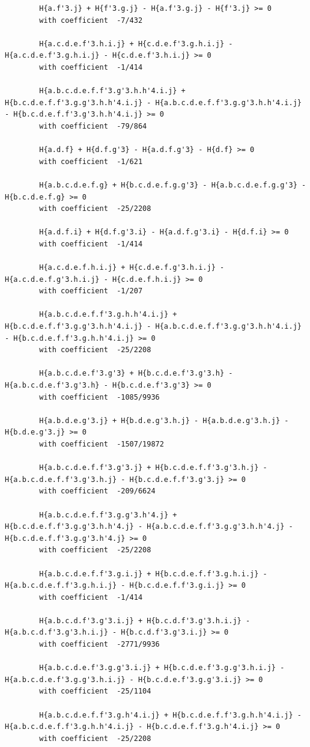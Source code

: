 \documentclass[11pt, a4paper]{kybernetika}
\begin{document}
\begin{verbatim}
		H{a.f'3.j} + H{f'3.g.j} - H{a.f'3.g.j} - H{f'3.j} >= 0
		with coefficient  -7/432
		
		H{a.c.d.e.f'3.h.i.j} + H{c.d.e.f'3.g.h.i.j} - H{a.c.d.e.f'3.g.h.i.j} - H{c.d.e.f'3.h.i.j} >= 0
		with coefficient  -1/414
		
		H{a.b.c.d.e.f.f'3.g'3.h.h'4.i.j} + H{b.c.d.e.f.f'3.g.g'3.h.h'4.i.j} - H{a.b.c.d.e.f.f'3.g.g'3.h.h'4.i.j} - H{b.c.d.e.f.f'3.g'3.h.h'4.i.j} >= 0
		with coefficient  -79/864
		
		H{a.d.f} + H{d.f.g'3} - H{a.d.f.g'3} - H{d.f} >= 0
		with coefficient  -1/621
		
		H{a.b.c.d.e.f.g} + H{b.c.d.e.f.g.g'3} - H{a.b.c.d.e.f.g.g'3} - H{b.c.d.e.f.g} >= 0
		with coefficient  -25/2208
		
		H{a.d.f.i} + H{d.f.g'3.i} - H{a.d.f.g'3.i} - H{d.f.i} >= 0
		with coefficient  -1/414
		
		H{a.c.d.e.f.h.i.j} + H{c.d.e.f.g'3.h.i.j} - H{a.c.d.e.f.g'3.h.i.j} - H{c.d.e.f.h.i.j} >= 0
		with coefficient  -1/207
		
		H{a.b.c.d.e.f.f'3.g.h.h'4.i.j} + H{b.c.d.e.f.f'3.g.g'3.h.h'4.i.j} - H{a.b.c.d.e.f.f'3.g.g'3.h.h'4.i.j} - H{b.c.d.e.f.f'3.g.h.h'4.i.j} >= 0
		with coefficient  -25/2208
		
		H{a.b.c.d.e.f'3.g'3} + H{b.c.d.e.f'3.g'3.h} - H{a.b.c.d.e.f'3.g'3.h} - H{b.c.d.e.f'3.g'3} >= 0
		with coefficient  -1085/9936
		
		H{a.b.d.e.g'3.j} + H{b.d.e.g'3.h.j} - H{a.b.d.e.g'3.h.j} - H{b.d.e.g'3.j} >= 0
		with coefficient  -1507/19872
		
		H{a.b.c.d.e.f.f'3.g'3.j} + H{b.c.d.e.f.f'3.g'3.h.j} - H{a.b.c.d.e.f.f'3.g'3.h.j} - H{b.c.d.e.f.f'3.g'3.j} >= 0
		with coefficient  -209/6624
		
		H{a.b.c.d.e.f.f'3.g.g'3.h'4.j} + H{b.c.d.e.f.f'3.g.g'3.h.h'4.j} - H{a.b.c.d.e.f.f'3.g.g'3.h.h'4.j} - H{b.c.d.e.f.f'3.g.g'3.h'4.j} >= 0
		with coefficient  -25/2208
		
		H{a.b.c.d.e.f.f'3.g.i.j} + H{b.c.d.e.f.f'3.g.h.i.j} - H{a.b.c.d.e.f.f'3.g.h.i.j} - H{b.c.d.e.f.f'3.g.i.j} >= 0
		with coefficient  -1/414
		
		H{a.b.c.d.f'3.g'3.i.j} + H{b.c.d.f'3.g'3.h.i.j} - H{a.b.c.d.f'3.g'3.h.i.j} - H{b.c.d.f'3.g'3.i.j} >= 0
		with coefficient  -2771/9936
		
		H{a.b.c.d.e.f'3.g.g'3.i.j} + H{b.c.d.e.f'3.g.g'3.h.i.j} - H{a.b.c.d.e.f'3.g.g'3.h.i.j} - H{b.c.d.e.f'3.g.g'3.i.j} >= 0
		with coefficient  -25/1104
		
		H{a.b.c.d.e.f.f'3.g.h'4.i.j} + H{b.c.d.e.f.f'3.g.h.h'4.i.j} - H{a.b.c.d.e.f.f'3.g.h.h'4.i.j} - H{b.c.d.e.f.f'3.g.h'4.i.j} >= 0
		with coefficient  -25/2208
		

\end{verbatim}
\end{document}
